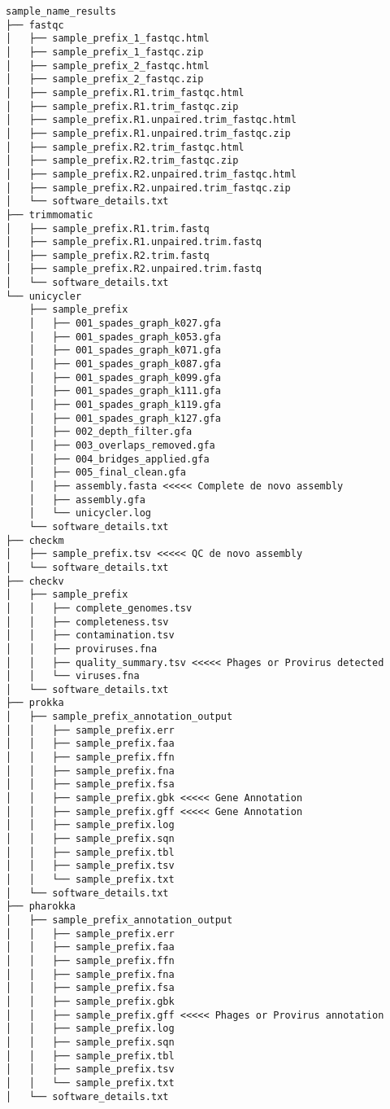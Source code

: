 \documentclass[
]{book}
\begin{document}
\begin{verbatim}
sample_name_results
├── fastqc
│   ├── sample_prefix_1_fastqc.html
│   ├── sample_prefix_1_fastqc.zip
│   ├── sample_prefix_2_fastqc.html
│   ├── sample_prefix_2_fastqc.zip
│   ├── sample_prefix.R1.trim_fastqc.html
│   ├── sample_prefix.R1.trim_fastqc.zip
│   ├── sample_prefix.R1.unpaired.trim_fastqc.html
│   ├── sample_prefix.R1.unpaired.trim_fastqc.zip
│   ├── sample_prefix.R2.trim_fastqc.html
│   ├── sample_prefix.R2.trim_fastqc.zip
│   ├── sample_prefix.R2.unpaired.trim_fastqc.html
│   ├── sample_prefix.R2.unpaired.trim_fastqc.zip
│   └── software_details.txt
├── trimmomatic
│   ├── sample_prefix.R1.trim.fastq
│   ├── sample_prefix.R1.unpaired.trim.fastq
│   ├── sample_prefix.R2.trim.fastq
│   ├── sample_prefix.R2.unpaired.trim.fastq
│   └── software_details.txt
└── unicycler
    ├── sample_prefix
    │   ├── 001_spades_graph_k027.gfa
    │   ├── 001_spades_graph_k053.gfa
    │   ├── 001_spades_graph_k071.gfa
    │   ├── 001_spades_graph_k087.gfa
    │   ├── 001_spades_graph_k099.gfa
    │   ├── 001_spades_graph_k111.gfa
    │   ├── 001_spades_graph_k119.gfa
    │   ├── 001_spades_graph_k127.gfa
    │   ├── 002_depth_filter.gfa
    │   ├── 003_overlaps_removed.gfa
    │   ├── 004_bridges_applied.gfa
    │   ├── 005_final_clean.gfa
    │   ├── assembly.fasta <<<<< Complete de novo assembly
    │   ├── assembly.gfa
    │   └── unicycler.log
    └── software_details.txt
├── checkm
│   ├── sample_prefix.tsv <<<<< QC de novo assembly
│   └── software_details.txt
├── checkv 
│   ├── sample_prefix
│   │   ├── complete_genomes.tsv
│   │   ├── completeness.tsv
│   │   ├── contamination.tsv
│   │   ├── proviruses.fna
│   │   ├── quality_summary.tsv <<<<< Phages or Provirus detected
│   │   └── viruses.fna
│   └── software_details.txt
├── prokka
│   ├── sample_prefix_annotation_output
│   │   ├── sample_prefix.err
│   │   ├── sample_prefix.faa
│   │   ├── sample_prefix.ffn
│   │   ├── sample_prefix.fna
│   │   ├── sample_prefix.fsa
│   │   ├── sample_prefix.gbk <<<<< Gene Annotation
│   │   ├── sample_prefix.gff <<<<< Gene Annotation
│   │   ├── sample_prefix.log
│   │   ├── sample_prefix.sqn
│   │   ├── sample_prefix.tbl
│   │   ├── sample_prefix.tsv
│   │   └── sample_prefix.txt
│   └── software_details.txt
├── pharokka
│   ├── sample_prefix_annotation_output
│   │   ├── sample_prefix.err
│   │   ├── sample_prefix.faa
│   │   ├── sample_prefix.ffn
│   │   ├── sample_prefix.fna
│   │   ├── sample_prefix.fsa
│   │   ├── sample_prefix.gbk
│   │   ├── sample_prefix.gff <<<<< Phages or Provirus annotation
│   │   ├── sample_prefix.log
│   │   ├── sample_prefix.sqn
│   │   ├── sample_prefix.tbl
│   │   ├── sample_prefix.tsv
│   │   └── sample_prefix.txt
│   └── software_details.txt

  
\end{verbatim}
\end{document}
